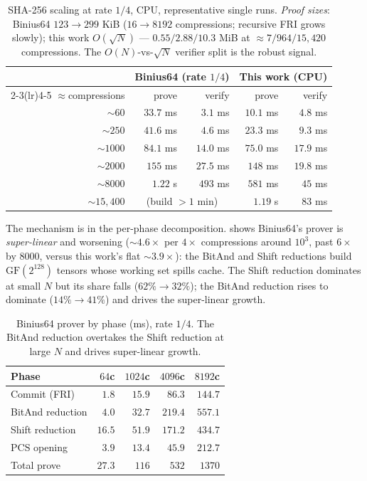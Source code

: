 \begin{table}[h]
\centering
\renewcommand{\arraystretch}{1.2}
\begin{tabular}{r r r r r}
\toprule
 & \multicolumn{2}{c}{Binius64 (rate $1/4$)} & \multicolumn{2}{c}{This work (CPU)} \\
\cmidrule(lr){2-3}\cmidrule(lr){4-5}
$\approx$compressions & prove & verify & prove & verify \\
\midrule
$\sim$$60$       & $33.7$ ms & $3.1$ ms  & $10.1$ ms & $4.8$ ms \\
$\sim$$250$      & $41.6$ ms & $4.6$ ms  & $23.3$ ms & $9.3$ ms \\
$\sim$$1000$     & $84.1$ ms & $14.0$ ms & $75.0$ ms & $17.9$ ms \\
$\sim$$2000$     & $155$ ms  & $27.5$ ms & $148$ ms  & $19.8$ ms \\
$\sim$$8000$     & $1.22$ s  & $493$ ms  & $581$ ms  & $45$ ms \\
$\sim$$15{,}400$ & \multicolumn{2}{c}{(build $>1$ min)} & $1.19$ s & $83$ ms \\
\bottomrule
\end{tabular}
\caption{SHA-256 scaling at rate $1/4$, CPU, representative single runs.
\emph{Proof sizes}: Binius64 $123\!\to\!299$ KiB ($16\!\to\!8192$ compressions;
recursive FRI grows slowly); this work $O(\sqrt N)$ --- $0.55/2.88/10.3$ MiB at
$\approx 7/964/15{,}420$ compressions. The $O(N)$-vs-$\sqrt N$ verifier split is
the robust signal.}
\label{tab:scaling}
\end{table}

The mechanism is in the per-phase decomposition.  shows
Binius64's prover is \emph{super-linear} and worsening ($\sim$$4.6\times$ per
$4\times$ compressions around $10^3$, past $6\times$ by $8000$, versus this
work's flat $\sim$$3.9\times$): the BitAnd and Shift reductions build
$\mathrm{GF}(2^{128})$ tensors whose working set spills cache. The Shift reduction
dominates at small $N$ but its share falls ($62\%\to32\%$); the BitAnd reduction
rises to dominate ($14\%\to41\%$) and drives the super-linear growth.

\begin{table}[h]
\centering
\renewcommand{\arraystretch}{1.2}
\begin{tabular}{l r r r r}
\toprule
Phase & $64$c & $1024$c & $4096$c & $8192$c \\
\midrule
Commit (FRI)        & $1.8$  & $15.9$ & $86.3$  & $144.7$ \\
BitAnd reduction    & $4.0$  & $32.7$ & $219.4$ & $557.1$ \\
Shift reduction     & $16.5$ & $51.9$ & $171.2$ & $434.7$ \\
PCS opening         & $3.9$  & $13.4$ & $45.9$  & $212.7$ \\
\midrule
Total prove         & $27.3$ & $116$  & $532$   & $1370$ \\
\bottomrule
\end{tabular}
\caption{Binius64 prover by phase (ms), rate $1/4$. The BitAnd reduction
overtakes the Shift reduction at large $N$ and drives super-linear growth.}
\label{tab:perphase-b64}
\end{table}

